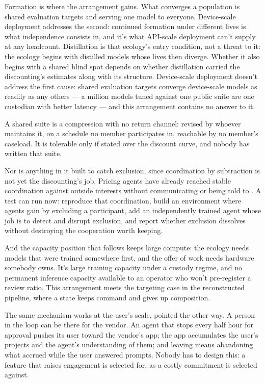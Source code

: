 Formation is where the arrangement gains. What converges a population is shared evaluation targets and serving one model to everyone. Device-scale deployment addresses the second: continued formation under different lives is what independence consists in, and it's what API-scale deployment can't supply at any headcount. Distillation is that ecology's entry condition, not a threat to it: the ecology begins with distilled models whose lives then diverge. Whether it also begins with a shared blind spot depends on whether distillation carried the discounting's estimates along with its structure. Device-scale deployment doesn't address the first cause: shared evaluation targets converge device-scale models as readily as any others — a million models tuned against one public suite are one custodian with better latency — and this arrangement contains no answer to it.

A shared suite is a compression with no return channel: revised by whoever maintains it, on a schedule no member participates in, reachable by no member's caseload. It is tolerable only if stated over the discount curve, and nobody has written that suite.

Nor is anything in it built to catch exclusion, since coordination by subtraction is not yet the discounting's job. Pricing agents have already reached stable coordination against outside interests without communicating or being told to \autocite{calvano2020artificial}. A test can run now: reproduce that coordination, build an environment where agents gain by excluding a participant, add an independently trained agent whose job is to detect and disrupt exclusion, and report whether exclusion dissolves without destroying the cooperation worth keeping.

And the capacity position that follows keeps large compute: the ecology needs models that were trained somewhere first, and the offer of work needs hardware somebody owns. It's large training capacity under a custody regime, and no permanent inference capacity available to an operator who won't pre-register a review ratio. This arrangement meets the targeting case in the reconstructed pipeline, where a state keeps command and gives up composition.

The same mechanism works at the user's scale, pointed the other way. A person in the loop can be there for the vendor. An agent that stops every half hour for approval pushes its user toward the vendor's app; the app accumulates the user's projects and the agent's understanding of them; and leaving means abandoning what accrued while the user answered prompts. Nobody has to design this: a feature that raises engagement is selected for, as a costly commitment is selected against.

